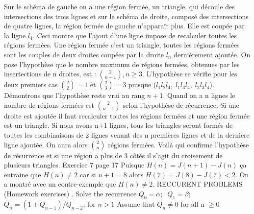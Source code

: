 \documentclass[9pt]{amsart}
\begin{document}
Sur le sch\'{e}ma de gauche on a une r\'{e}gion ferm\'{e}e, un triangle, qui d\'{e}coule des intersections des trois lignes et sur le sch\'{e}ma de droite, compos\'{e} des intersections de quatre lignes, la r\'{e}gion ferm\'{e}e de gauche n'apparaît plus. Elle est coup\'{e}e par la ligne $l_4$. Ceci montre que l'ajout d'une ligne impose de recalculer toutes les r\'{e}gions ferm\'{e}es. \newline
Une r\'{e}gion ferm\'{e}e c'est un triangle, toutes les r\'{e}gions ferm\'{e}es sont les couples de deux droites coup\'{e}es par la droite $l_n$ derni\`{e}rement ajout\'{e}e. \newline\newline
On pose l'hypoth\`{e}se que le nombre maximum de r\'{e}gions ferm\'{e}es, obtenues  par les insertections de n droites, est :  $\binom{2}{n-1},  n\geq3$. \newline\newline
L'hypoth\`{e}se se v\'{e}rifie pour les deux premiers cas $\binom{2}{2} = 1$ et $\binom{2}{3} = 3$ puisque ($l_1l_2l_4,\; l_1l_3l_4,\; l_2l_3l_4$). D\'{e}montrons que l'hypoth\`{e}se reste vrai au rang $n+1$.
Quand on a n lignes le nombre de r\'{e}gions ferm\'{e}es est $\binom{2}{n-1}$ selon l'hypoth\`{e}se de r\'{e}currence. Si une droite est ajout\'{e}e il faut recalculer toutes les r\'{e}gions ferm\'{e}es et une r\'{e}gion ferm\'{e}e est un triangle. 
Si nous avons n+1 lignes, tous les triangles seront form\'{e}s de toutes les combinaisons de 2 lignes 
venant des n premi\`{e}res lignes et de la derni\`{e}re ligne ajout\'{e}e. 
On aura alors $\binom{2}{n}$ r\'{e}gions ferm\'{e}es. Voil\`{a} qui confirme l'hypoth\`{e}se de r\'{e}currence et si une r\'{e}gion a plus de 3 côt\'{e}s
il s'agit du croisement de plusieurs triangles. 
 \newline\newline
Exercice 7 page 17 \newline
Puisque $H(n) = J(n+1) - J(n)$ ça entraine que $H(n) \neq 2$ car si $n+1 = 8$ alors $H(7) = J(8) - J(7) < 2$.\newline
On a montr\'{e} avec un contre-exemple que  $H(n) \neq 2$.
\newline\newline
RECCURENT PROBLEMS (Homework exercises)
\newline{}. Solve the recurrence 
$Q_{0} = \alpha; \;\; Q_{1}= \beta;$\newline 
$Q_{n} = (1 + Q_{n-1}) / Q_{n-2}$, for $n > 1$
\newline Assume that $Q_{n}  \neq 0$ for all n $\geq 0$\newline\newline
\end{document}
